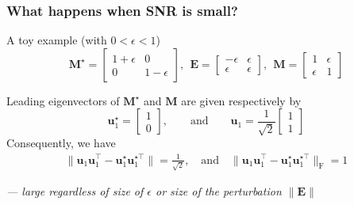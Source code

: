 \documentclass[compress,
mathserif,wide,%
]{beamer}
\begin{document}
\begin{frame}
	\frametitle{What happens when SNR is small?}
A toy example (with $0<\epsilon<1$)
	\[
\bm{M}^{\star}=\left[\begin{array}{cc}
1+\epsilon & 0\\
0 & 1-\epsilon
\end{array}\right],
~~
\bm{E}=\left[\begin{array}{cc}
-\epsilon & \epsilon\\
\epsilon & \epsilon
\end{array}\right],~~
\bm{M}=\left[\begin{array}{cc}
1 & \epsilon\\
\epsilon & 1
\end{array}\right]
\]

Leading eigenvectors of $\bm{M}^{\star}$ and $\bm{M}$ are given respectively by
%
\[
\bm{u}_{1}^{\star}=\left[\begin{array}{c}
1\\
0
\end{array}\right],
\qquad\text{and}\qquad
\bm{u}_{1}=\frac{1}{\sqrt{2}} \left[\begin{array}{c}
1 \\
1
\end{array}\right] 
\]
%
Consequently, we have
%
\begin{align*}
	\big\|\bm{u}_{1}\bm{u}_{1}^{\top} - \bm{u}_{1}^{\star}\bm{u}_{1}^{\star\top}\big\| = \frac{1}{\sqrt{2}}, 
	\quad \text{and} \quad
	\big\|\bm{u}_{1}\bm{u}_{1}^{\top} - \bm{u}_{1}^{\star}\bm{u}_{1}^{\star\top}\big\|_{\mathrm{F}}= 1
\end{align*}

{\hfill \small \em --- large regardless of size of $\epsilon$ or size of the perturbation $\|\bm{E}\|$}
\end{frame}
\end{document}
